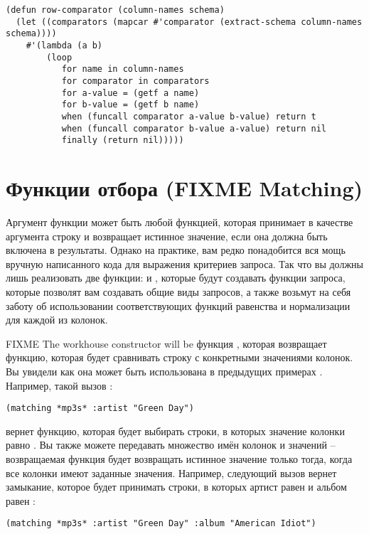 \begin{lstlisting}
(defun row-comparator (column-names schema)
  (let ((comparators (mapcar #'comparator (extract-schema column-names schema))))
    #'(lambda (a b)
        (loop
           for name in column-names
           for comparator in comparators
           for a-value = (getf a name)
           for b-value = (getf b name)
           when (funcall comparator a-value b-value) return t
           when (funcall comparator b-value a-value) return nil
           finally (return nil)))))
\end{lstlisting}

\section{Функции отбора (FIXME Matching)}

Аргумент  функции  может быть любой функцией, которая принимает
в качестве аргумента строку и возвращает истинное значение, если она должна быть включена
в результаты.  Однако на практике, вам редко понадобится вся мощь вручную написанного кода
для выражения критериев запроса.  Так что вы должны лишь реализовать две функции:
 и , которые будут создавать функции запроса, которые позволят вам
создавать общие виды запросов, а также возьмут на себя заботу об использовании
соответствующих функций равенства и нормализации для каждой из колонок.

FIXME The workhouse  constructor will be функция ,
которая возвращает функцию, которая будет сравнивать строку с конкретными значениями
колонок.  Вы увидели как она может быть использована в предыдущих примерах .
Например, такой вызов :

\begin{lstlisting}
(matching *mp3s* :artist "Green Day")
\end{lstlisting}

вернет функцию, которая будет выбирать строки, в которых значение колонки 
равно .  Вы также можете передавать множество имён колонок и значений --
возвращаемая функция будет возвращать истинное значение только тогда, когда все колонки
имеют заданные значения.  Например, следующий вызов вернет замыкание, которое будет
принимать строки, в которых артист равен  и альбом равен :

\begin{lstlisting}
(matching *mp3s* :artist "Green Day" :album "American Idiot")
\end{lstlisting}

